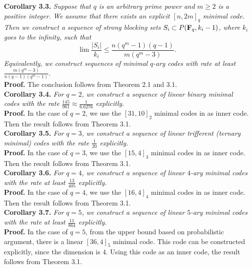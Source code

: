 \documentclass[10pt,a4paper]{article}
\begin{document}
{\bf Corollary 3.3.} {\em Suppose that $q$ is an arbitrary prime power and $m \geq 2$ is a positive integer. We assume that there exists an explicit $[n,2m]_q$ minimal code. Then we construct a sequence of strong blocking sets $S_i \subset P({\bf F}_q, k_i-1)$, where $k_i$ goes to the infinity,  such that $$\lim \frac{|S_i|}{k_i}\leq \frac{n(q^m-1)(q-1)}{m(q^m-3)}.$$ Equivalently, we construct sequences of minimal $q$-ary codes with rate at least $\frac{m(q^m-3)}{n(q-1)(q^m-1)}$.}\\

{\bf Proof.} The conclusion follows from Theorem 2.1 and 3.1.\\

{\bf Corollary 3.4.} {\em For $q=2$, we construct a sequence of linear binary minimal codes with the rate $\frac{145}{961} \approx \frac{1}{6.6276}$ explicitly.}\\

{\bf Proof.} In the case of $q=2$, we use the $[31,10]_2$ minimal codes in \cite[Table 1]{Kurz} as inner code. Then the result follows from Theorem 3.1.\\




{\bf Corollary 3.5.} {\em For $q=3$, we construct a sequence of linear trifferent (ternary minimal) codes with the rate $\frac{1}{20}$ explicitly.}\\


{\bf Proof.} In the case of $q=3$, we use the $[15,4]_3$ minimal codes in \cite[Page 11]{Kurz} as inner code. Then the result follows from Theorem 3.1.\\





{\bf Corollary 3.6.} {\em For $q=4$, we construct a sequence of linear $4$-ary minimal codes with the rate at least $\frac{13}{405}$ explicitly.}\\

{\bf Proof.} In the case of $q=4$, we use the $[16,4]_4$ minimal codes in \cite[Table 1]{Kurz} as inner code. Then the result follows from Theorem 3.1.\\



{\bf Corollary 3.7.} {\em For $q=5$, we construct a sequence of linear $5$-ary minimal codes with the rate at least $\frac{11}{864}$ explicitly.}\\

{\bf Proof.} In the case of $q=5$, from the upper bound based on probabilistic argument, there is a linear $[36,4]_5$ minimal code. This code can be constructed explicitly, since the dimension is $4$. Using this code as an inner code, the result follows from Theorem 3.1.\\
\end{document}
